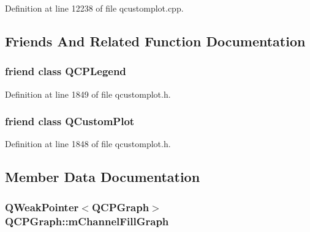 Definition at line 12238 of file qcustomplot.\-cpp.



\subsection{Friends And Related Function Documentation}
\hypertarget{class_q_c_p_graph_a8429035e7adfbd7f05805a6530ad5e3b}{
\subsubsection[{Q\-C\-P\-Legend}]{\setlength{\rightskip}{0pt plus 5cm}friend class {\bf Q\-C\-P\-Legend}\hspace{0.3cm}{\ttfamily [friend]}}}\label{class_q_c_p_graph_a8429035e7adfbd7f05805a6530ad5e3b}


Definition at line 1849 of file qcustomplot.\-h.

\hypertarget{class_q_c_p_graph_a1cdf9df76adcfae45261690aa0ca2198}{
\subsubsection[{Q\-Custom\-Plot}]{\setlength{\rightskip}{0pt plus 5cm}friend class {\bf Q\-Custom\-Plot}\hspace{0.3cm}{\ttfamily [friend]}}}\label{class_q_c_p_graph_a1cdf9df76adcfae45261690aa0ca2198}


Definition at line 1848 of file qcustomplot.\-h.



\subsection{Member Data Documentation}
\hypertarget{class_q_c_p_graph_af307480bd1fa5bc54160c74419bc5482}{
\subsubsection[{m\-Channel\-Fill\-Graph}]{\setlength{\rightskip}{0pt plus 5cm}Q\-Weak\-Pointer$<${\bf Q\-C\-P\-Graph}$>$ Q\-C\-P\-Graph\-::m\-Channel\-Fill\-Graph\hspace{0.3cm}{\ttfamily [protected]}}}\label{class_q_c_p_graph_af307480bd1fa5bc54160c74419bc5482}


